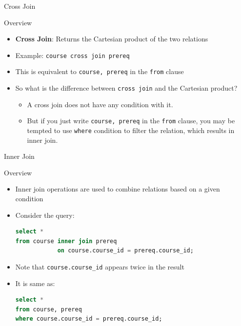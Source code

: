 \documentclass[aspectratio=169, xcolor=dvipsnames]{beamer}
\begin{document}
\begin{frame}{Cross Join}
    \begin{block}{Overview}
        \begin{itemize}[<+->]
            \item \textbf{Cross Join}: Returns the Cartesian product of the two relations
            \item Example: \texttt{course cross join prereq}
            \item This is equivalent to \texttt{course, prereq} in the \texttt{from} clause
            \item So what is the difference between \texttt{cross join} and the Cartesian product?
            \begin{itemize}
                \item[$\triangleright$] A cross join does not have any condition with it.
                \item[$\triangleright$] But if you just write \texttt{course, prereq} in the \texttt{from} clause, you may be tempted to use \texttt{where} condition to filter the relation, which results in inner join.
            \end{itemize}
        \end{itemize}
    \end{block}
\end{frame}

\begin{frame}[fragile]{Inner Join}
    \begin{block}{Overview}
        \begin{itemize}[<+->]
            \item Inner join operations are used to combine relations based on a given condition
            \item Consider the query:
            \begin{lstlisting}[language=SQL]
select * 
from course inner join prereq 
            on course.course_id = prereq.course_id;
            \end{lstlisting}
            \item Note that \texttt{course.course\_id} appears twice in the result
            \item It is same as:
            \begin{lstlisting}[language=SQL]
select * 
from course, prereq 
where course.course_id = prereq.course_id;
            \end{lstlisting}
        \end{itemize}
    \end{block}
\end{frame}
\end{document}
